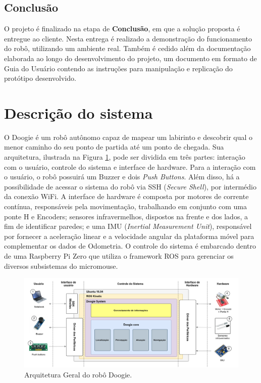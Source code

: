 \subsection{Conclusão}
\label{metodologia_conclusao}
O projeto é finalizado na etapa de \textbf{Conclusão}, em que a solução proposta é entregue ao cliente. Nesta entrega é realizado a demonstração do funcionamento do robô, utilizando um ambiente real. Também é cedido além da documentação elaborada ao longo do desenvolvimento do projeto, um documento em formato de Guia do Usuário contendo as instruções para manipulação e replicação do protótipo desenvolvido.

\section{Descrição do sistema}
\label{sec:descricao_do_sistema}
O Doogie é um robô autônomo capaz de mapear um labirinto e descobrir qual o menor caminho do seu ponto de partida até um ponto de chegada. Sua arquitetura, ilustrada na Figura \ref{fig:arquitetura_geral}, pode ser dividida em três partes: interação com o usuário, controle do sistema e interface de hardware.
Para a interação com o usuário, o robô possuirá um Buzzer e dois \textit{Push Buttons}. Além disso, há a possibilidade de acessar o sistema do robô via SSH (\textit{Secure Shell}), por intermédio da conexão WiFi. A interface de hardware é composta por motores de corrente contínua, responsáveis pela movimentação, trabalhando em conjunto com uma ponte H e Encoders; sensores infravermelhos, dispostos na frente e dos lados, a fim de identificar paredes; e uma IMU (\textit{Inertial Measurement Unit}), responsável por fornecer a aceleração linear e a velocidade angular da plataforma móvel para complementar os dados de Odometria. O controle do sistema é embarcado dentro de uma Raspberry Pi Zero que utiliza o framework ROS para gerenciar os diversos subsistemas do micromouse.

\begin{figure}[H]
	\label{fig:arquitetura_geral}
	\centering
	\caption{Arquitetura Geral do robô Doogie.}
	\includegraphics[width=1\textwidth]
	{Figures/arquitetura_geral}
\end{figure}

